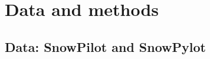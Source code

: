 \documentclass[hess, manuscript]{copernicus}
\begin{document}
%
%
%
%
%


\section{Data and methods}
\label{sec:data_methods}

\subsection{Data: SnowPilot and SnowPylot}
\label{sec:snowpylot}
\end{document}

